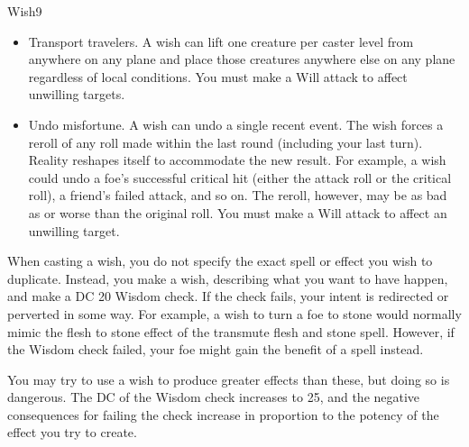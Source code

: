 \begin{spellsection}{Wish}{9}
\begin{spellcontent}
\begin{itemize}
        \item Transport travelers. A wish can lift one creature per caster level from anywhere on any plane and place those creatures anywhere else on any plane regardless of local conditions. You must make a Will attack to affect unwilling targets.
        \item Undo misfortune. A wish can undo a single recent event. The wish forces a reroll of any roll made within the last round (including your last turn). Reality reshapes itself to accommodate the new result. For example, a wish could undo a foe's successful critical hit (either the attack roll or the critical roll), a friend's failed attack, and so on. The reroll, however, may be as bad as or worse than the original roll. You must make a Will attack to affect an unwilling target.
    \end{itemize}
    \par When casting a wish, you do not specify the exact spell or effect you wish to duplicate. Instead, you make a wish, describing what you want to have happen, and make a DC 20 Wisdom check. If the check fails, your intent is redirected or perverted in some way. For example, a wish to turn a foe to stone would normally mimic the flesh to stone effect of the transmute flesh and stone spell. However, if the Wisdom check failed, your foe might gain the benefit of a  spell instead.
    \par You may try to use a wish to produce greater effects than these, but doing so is dangerous. The DC of the Wisdom check increases to 25, and the negative consequences for failing the check increase in proportion to the potency of the effect you try to create.
\end{spellcontent}
\end{spellsection}

